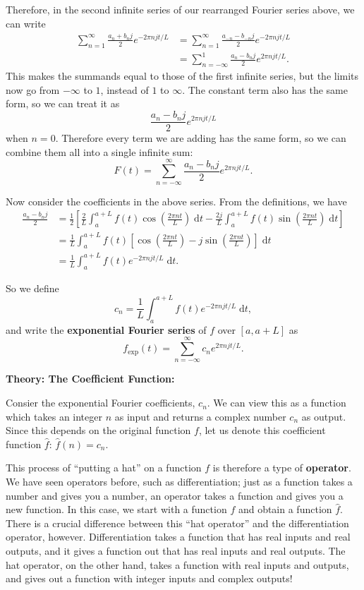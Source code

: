 \documentclass{article}
\newcommand{\diff}{\;\mathrm{d}}
\begin{document}
Therefore, in the second infinite series of our rearranged Fourier series above, we can write
\begin{align*}
	\sum_{n=1}^\infty \frac{a_n+b_nj}{2}e^{-2\pi njt/L}&=\sum_{n=1}^\infty \frac{a_{-n}-b_{-n}j}{2}e^{-2\pi njt/L}\\
	&= \sum_{n=-\infty}^1 \frac{a_n-b_nj}{2}e^{2\pi njt/L}.
\end{align*}
This makes the summands equal to those of the first infinite series, but the limits now go from $-\infty$ to $1$, instead of $1$ to $\infty$. The constant term also has the same form, so we can treat it as
\[\frac{a_n-b_nj}{2}e^{2\pi njt/L}\]
when $n=0$. Therefore every term we are adding has the same form, so we can combine them all into a single infinite sum:
\[F(t)=\sum_{n=-\infty}^\infty \frac{a_n-b_nj}{2}e^{2\pi njt/L}.\]\medskip


Now consider the coefficients in the above series. From the definitions, we have
\begin{align*}
	\frac{a_n-b_nj}{2} &= \frac{1}{2}\left[\frac{2}{L}\int_a^{a+L}\!\!f(t)\cos\left(\frac{2\pi nt}{L}\right)\diff t -\frac{2j}{L}\int_a^{a+L}\!\! f(t)\sin\left(\frac{2\pi nt}{L}\right)\diff t\right]\\
	&=\frac{1}{L}\int_a^{a+L}\!\!f(t)\left[\cos\left(\frac{2\pi nt}{L}\right) - j \sin\left(\frac{2\pi nt}{L}\right)\right]\diff t\\
	&=\frac{1}{L}\int_a^{a+L}\!\! f(t)e^{-2\pi njt/L}\diff t.
\end{align*}

So we define
\[c_n=\frac{1}{L}\int_a^{a+L}\!\!f(t)e^{-2\pi njt/L}\diff t,\]
and write the \textbf{exponential Fourier series} of $f$ over $[a,a+L]$ as
\[f_\mathrm{exp}(t)=\sum_{n=-\infty}^\infty c_n e^{2\pi njt/L}.\]




\clearpage












\textbf{Theory: The Coefficient Function:}\bigskip


Consier the exponential Fourier coefficients, $c_n$. We can view this as a function which takes an integer $n$ as input and returns a complex number $c_n$ as output. Since this depends on the original function $f$, let us denote this coefficient function $\hat{f}$: $\hat{f}(n)=c_n$.

This process of ``putting a hat'' on a function $f$ is therefore a type of \textbf{operator}. We have seen operators before, such as differentiation; just as a function takes a number and gives you a number, an operator takes a function and gives you a new function. In this case, we start with a function $f$ and obtain a function $\hat{f}$. There is a crucial difference between this ``hat operator'' and the differentiation operator, however. Differentiation takes a function that has real inputs and real outputs, and it gives a function out that has real inputs and real outputs. The hat operator, on the other hand, takes a function with real inputs and outputs, and gives out a function with integer inputs and complex outputs!
\end{document}
